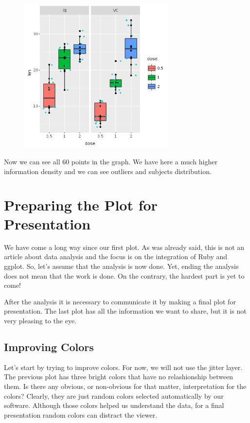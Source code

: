 \documentclass[11pt,]{article}
\begin{document}
\begin{figure}
\centering
\includegraphics[width=0.70000\textwidth]{figures/facets_with_jitter.png}
\caption{}
\end{figure}

Now we can see all 60 points in the graph. We have here a much higher
information density and we can see outliers and subjects distribution.

\section{Preparing the Plot for
Presentation}\label{preparing-the-plot-for-presentation}

We have come a long way since our first plot. As was already said, this
is not an article about data analysis and the focus is on the
integration of Ruby and ggplot. So, let's assume that the analysis is
now done. Yet, ending the analysis does not mean that the work is done.
On the contrary, the hardest part is yet to come!

After the analysis it is necessary to communicate it by making a final
plot for presentation. The last plot has all the information we want to
share, but it is not very pleasing to the eye.

\subsection{Improving Colors}\label{improving-colors}

Let's start by trying to improve colors. For now, we will not use the
jitter layer. The previous plot has three bright colors that have no
relashionship between them. Is there any obvious, or non-obvious for
that matter, interpretation for the colors? Clearly, they are just
random colors selected automatically by our software. Although those
colors helped us understand the data, for a final presentation random
colors can distract the viewer.
\end{document}
